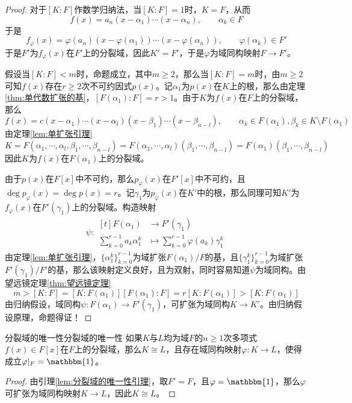 \documentclass[lang = cn, scheme = chinese, thmcnt = section]{elegantbook}
\begin{document}
\begin{proof}
	对于$[K:F]$作数学归纳法，当$[K:F]=1$时，$K=F$，从而
	$$
	f(x)=a_n(x-\alpha_1)\cdots(x-\alpha_n),\qquad \alpha_k\in F
	$$
	于是
	$$
	f_\varphi(x)=\varphi(a_n)(x-\varphi(\alpha_1))\cdots(x-\varphi(\alpha_n)),\qquad \varphi(\alpha_k)\in F'
	$$
	于是$F'$为$f_\varphi(x)$在$F'$上的分裂域，因此$K'=F'$，于是$\varphi$为域同构映射$F\to F'$。
	
	假设当$[K:F]<m$时，命题成立，其中$m\ge 2$，那么当$[K:F]=m$时，由$m\ge 2$可知$f(x)$存在$r\ge 2$次不可约因式$p(x)$。记$\alpha_1$为$p(x)$在$K$上的根，那么由定理\ref{thm:单代数扩张的基}，$[F(\alpha_1):F]=r>1$。由于$K$为$f(x)$在$F$上的分裂域，那么
	$$
	f(x)=c(x-\alpha_1)\cdots(x-\alpha_l)(x-\beta_1)\cdots(x-\beta_{n-l}),\qquad \alpha_k\in F(\alpha_1),\beta_k\in K\setminus F(\alpha_1)
	$$
	由定理\ref{lem:单扩张引理}
	$$
	K=F(\alpha_1,\cdots,\alpha_l,\beta_1,\cdots,\beta_{n-l})=F(\alpha_1,\cdots,\alpha_l)(\beta_1,\cdots,\beta_{n-l})=F(\alpha_1)(\beta_1,\cdots,\beta_{n-l})
	$$
	因此$K$为$f(x)$在$F(\alpha_1)$上的分裂域。
	
	由于$p(x)$在$F[x]$中不可约，那么$p_\varphi(x)$在$F'[x]$中不可约，且$\deg p_\varphi(x)=\deg p(x)=r$。记$\gamma_1$为$p_\varphi(x)$在$K'$中的根，那么同理可知$K'$为$f_\varphi(x)$在$F'(\gamma_1)$上的分裂域。构造映射
	\begin{align*}
		\psi:\begin{aligned}[t]
			F(\alpha_1)&\longrightarrow F'(\gamma_1)\\
			\sum_{k=0}^{r-1}a_k\alpha_1^k&\longmapsto \sum_{k=0}^{r-1}\varphi(a_k)\gamma_1^k
		\end{aligned}
	\end{align*}
	由定理\ref{lem:单扩张引理}，$\{\alpha_1^k\}_{k=0}^{r-1}$为域扩张$F(\alpha_1)/F$的基，且$\{\gamma_1^k\}_{k=0}^{r-1}$为域扩张$F'(\gamma_1)/F'$的基，那么该映射定义良好，且为双射，同时容易知道$\psi$为域同构。由望远镜定理\ref{thm:望远镜定理}
	$$
	m>[K:F]=[K:F(\alpha_1)][F(\alpha_1):F]=r[K:F(\alpha_1)]>[K:F(\alpha_1)]
	$$
	由归纳假设，域同构$\psi:F(\alpha_1)\to F'(\gamma_1)$，可扩张为域同构$K\to K'$。由归纳假设原理，命题得证！
\end{proof}

\begin{theorem}{分裂域的唯一性}{分裂域的唯一性}
	如果$K$与$L$均为域$F$的$n\ge 1$次多项式$f(x)\in F[x]$在$F$上的分裂域，那么$K\cong L$，且存在域同构映射$\varphi:K\to L$，使得成立$\varphi|_F=\mathbbm{1}$。
\end{theorem}

\begin{proof}
	由引理\ref{lem:分裂域的唯一性引理}，取$F'=F$，且$\varphi=\mathbbm{1}$，那么$\varphi$可扩张为域同构映射$K\to L$，因此$K\cong L$。
\end{proof}
\end{document}
